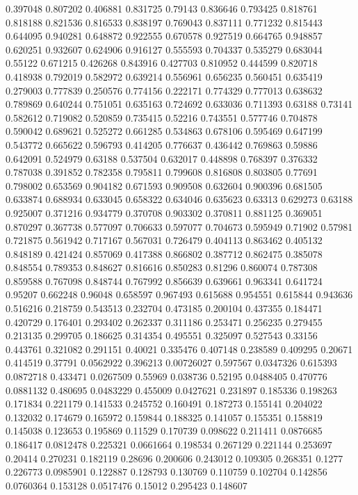 0.397048 0.807202
0.406881 0.831725
0.79143 0.836646
0.793425 0.818761
0.818188 0.821536
0.816533 0.838197
0.769043 0.837111
0.771232 0.815443
0.644095 0.940281
0.648872 0.922555
0.670578 0.927519
0.664765 0.948857
0.620251 0.932607
0.624906 0.916127
0.555593 0.704337
0.535279 0.683044
0.55122 0.671215
0.426268 0.843916
0.427703 0.810952
0.444599 0.820718
0.418938 0.792019
0.582972 0.639214
0.556961 0.656235
0.560451 0.635419
0.279003 0.777839
0.250576 0.774156
0.222171 0.774329
0.777013 0.638632
0.789869 0.640244
0.751051 0.635163
0.724692 0.633036
0.711393 0.63188
0.73141 0.582612
0.719082 0.520859
0.735415 0.52216
0.743551 0.577746
0.704878 0.590042
0.689621 0.525272
0.661285 0.534863
0.678106 0.595469
0.647199 0.543772
0.665622 0.596793
0.414205 0.776637
0.436442 0.769863
0.59886 0.642091
0.524979 0.63188
0.537504 0.632017
0.448898 0.768397
0.376332 0.787038
0.391852 0.782358
0.795811 0.799608
0.816808 0.803805
0.77691 0.798002
0.653569 0.904182
0.671593 0.909508
0.632604 0.900396
0.681505 0.633874
0.688934 0.633045
0.658322 0.634046
0.635623 0.63313
0.629273 0.63188
0.925007 0.371216
0.934779 0.370708
0.903302 0.370811
0.881125 0.369051
0.870297 0.367738
0.577097 0.706633
0.597077 0.704673
0.595949 0.71902
0.57981 0.721875
0.561942 0.717167
0.567031 0.726479
0.404113 0.863462
0.405132 0.848189
0.421424 0.857069
0.417388 0.866802
0.387712 0.862475
0.385078 0.848554
0.789353 0.848627
0.816616 0.850283
0.81296 0.860074
0.787308 0.859588
0.767098 0.848744
0.767992 0.856639
0.639661 0.963341
0.641724 0.95207
0.662248 0.96048
0.658597 0.967493
0.615688 0.954551
0.615844 0.943636
0.516216 0.218759
0.543513 0.232704
0.473185 0.200104
0.437355 0.184471
0.420729 0.176401
0.293402 0.262337
0.311186 0.253471
0.256235 0.279455
0.213135 0.299705
0.186625 0.314354
0.495551 0.325097
0.527543 0.33156
0.443761 0.321082
0.291151 0.40021
0.335476 0.407148
0.238589 0.409295
0.20671 0.414519
0.37791 0.0562922
0.396213 0.00726027
0.597567 0.0347326
0.615393 0.0872718
0.433471 0.0267509
0.55969 0.038736
0.52195 0.0488405
0.470776 0.0881132
0.480695 0.0483229
0.455009 0.0427621
0.231897 0.185336
0.198263 0.171834
0.221179 0.141533
0.245752 0.160491
0.187273 0.155141
0.204022 0.132032
0.174679 0.165972
0.159844 0.188325
0.141057 0.155351
0.158819 0.145038
0.123653 0.195869
0.11529 0.170739
0.098622 0.211411
0.0876685 0.186417
0.0812478 0.225321
0.0661664 0.198534
0.267129 0.221144
0.253697 0.20414
0.270231 0.182119
0.28696 0.200606
0.243012 0.109305
0.268351 0.1277
0.226773 0.0985901
0.122887 0.128793
0.130769 0.110759
0.102704 0.142856
0.0760364 0.153128
0.0517476 0.15012
0.295423 0.148607
